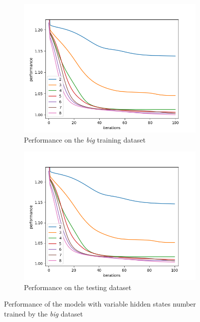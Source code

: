 \documentclass[thesis=M,english]{FITthesis}[2012/10/20]
\begin{document}
\begin{itemize}
\begin{figure}
\centering
\begin{subfigure}{.8\textwidth}
  \centering
  \includegraphics[width=1\linewidth]{img/ex5/train_big.png}
  \caption{Performance on the \textit{big} training dataset}
  \label{fig:bgtrain}
\end{subfigure}
\begin{subfigure}{.8\textwidth}
  \centering
  \includegraphics[width=1\linewidth]{img/ex5/test_big.png}
  \caption{Performance on the testing dataset}
  \label{fig:bgtest}
\end{subfigure}
\caption{Performance of the models with variable hidden states number trained by the \textit{big} dataset}
\label{fig:bg}
\end{figure}


\end{itemize}
\end{document}
